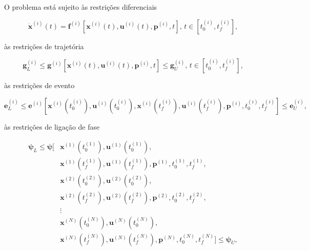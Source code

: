 \noindent O problema está sujeito às restrições diferenciais

\begin{equation}
\label{eq:restrições-diferenciais}
    \dot{\mathbf{x}}^{(i)}(t) = \mathbf{f}^{(i)} \left[ \mathbf{x}^{(i)}(t), \mathbf{u}^{(i)}(t), \mathbf{p}^{(i)}, t \right], \, t \in \left[ t_0^{(i)}, t_f^{(i)} \right],
\end{equation}

\noindent às restrições de trajetória

\begin{equation}
\label{eq:restrições-trajetória}
    \mathbf{g}_L^{(i)} \leq \mathbf{g}^{(i)} \left[ \mathbf{x}^{(i)}(t), \mathbf{u}^{(i)}(t), \mathbf{p}^{(i)}, t \right] \leq \mathbf{g}_U^{(i)}, \, t \in \left[ t_0^{(i)}, t_f^{(i)} \right],
\end{equation}

\noindent às restrições de evento

\begin{equation}
\label{eq:restrições-evento}
     \mathbf{e}_L^{(i)} \leq \mathbf{e}^{(i)} \left[ 
     \mathbf{x}^{(i)} \left( t_0^{(i)} \right),
     \mathbf{u}^{(i)} \left( t_0^{(i)} \right),
     \mathbf{x}^{(i)} \left( t_f^{(i)} \right),
     \mathbf{u}^{(i)} \left( t_f^{(i)} \right),
     \mathbf{p}^{(i)}, 
     t_0^{(i)},
     t_f^{(i)} \right] \leq \mathbf{e}_U^{(i)},
\end{equation}

\noindent às restrições de ligação de fase

\begin{equation}
\label{eq:restrições-fase}
\begin{aligned}
    \boldsymbol{\psi}_L \leq \boldsymbol{\psi} [ & \mathbf{x}^{(1)} \left( t_0^{(1)} \right), \mathbf{u}^{(1)} \left( t_0^{(1)} \right), \\
        & \mathbf{x}^{(1)} \left( t_f^{(1)} \right), \mathbf{u}^{(1)} \left( t_f^{(1)} \right), \mathbf{p}^{(1)}, t_0^{(1)}, t_f^{(1)}, \\
        & \mathbf{x}^{(2)} \left( t_0^{(2)} \right), \mathbf{u}^{(2)} \left( t_0^{(2)} \right), \\
        & \mathbf{x}^{(2)} \left( t_f^{(2)} \right), \mathbf{u}^{(2)} \left( t_f^{(2)} \right), \mathbf{p}^{(2)}, t_0^{(2)}, t_f^{(2)}, \\
        & \vdots \\
        & \mathbf{x}^{(N)} \left( t_0^{(N)} \right), \mathbf{u}^{(N)} \left( t_0^{(N)} \right), \\
        & \mathbf{x}^{(N)} \left( t_f^{(N)} \right), \mathbf{u}^{(N)} \left( t_f^{(N)} \right), \mathbf{p}^{(N)}, t_0^{(N)}, t_f^{(N)} ] \leq \boldsymbol{\psi}_U ,
\end{aligned}
\end{equation}


